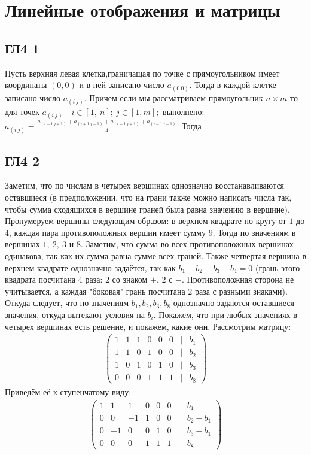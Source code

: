 \newpage		
	\section{Линейные отображения и матрицы}
		
		\subsection{ГЛ4 1}
		Пусть верхняя левая клетка,граничащая по точке с прямоугольником имеет координаты $(0,0)$ и в ней записано число $a_{(0\ 0)}$. Тогда в каждой клетке записано число $a_{(i\ j)}$. Причем если мы рассматриваем прямоугольник $n \times m$ то для точек $a_{(i\ j)} \quad i \in [1,\ n];\ j \in [1, m];$ выполнено: $a_{(i\ j)} = \frac{a_{(i+1\ j+1)} + a_{(i+1\ j-1)} + a_{(i-1\ j+1)} + a_{(i-1\ j-1)}}{4}$. Тогда 
		
		\subsection{ГЛ4 2}
		Заметим, что по числам в четырех вершинах однозначно восстанавливаются оставшиеся (в предположении, что на грани также можно написать числа так, чтобы сумма сходящихся в вершине граней была равна значению в вершине). Пронумеруем вершины следующим образом: в верхнем квадрате по кругу от $1$ до $4$, каждая пара противоположных вершин имеет сумму $9$. Тогда по значениям в вершинах $1,\ 2,\ 3$ и $8$. Заметим, что сумма во всех противоположных вершинах одинакова, так как их сумма равна сумме всех граней. Также четвертая вершина в верхнем квадрате однозначно задаётся, так как $b_1 - b_2 - b_3 + b_4 = 0$ (грань этого квадрата посчитана $4$ раза: $2$ со знаком $+$, $2$ с $-$. Противоположная сторона не учитывается, а каждая "боковая" грань посчитана $2$ раза с разными знаками). Откуда следует, что по значениям $b_1,b_2,b_3,b_8$ однозначно задаются оставшиеся значения, откуда вытекают условия на $b_i$. Покажем, что при любых значениях в четырех вершинах есть решение, и покажем, какие они. Рассмотрим матрицу:
		\begin{gather*}
			\begin{pmatrix} 
				1 & 1 & 1 & 0 & 0 & 0 & | & b_1\\ 
				1 & 1 & 0 & 1 & 0 & 0 & | & b_2\\
				1 & 0 & 1 & 0 & 1 & 0 & | & b_3\\
				0 & 0 & 0 & 1 & 1 & 1 & | & b_8 
			\end{pmatrix}
		\end{gather*} 
		Приведём её к ступенчатому виду:
		\begin{gather*}
			\begin{pmatrix}
				1 & 1  & 1  & 0 & 0 & 0 & | & b_1\\ 
				0 & 0  & -1 & 1 & 0 & 0 & | & b_2 - b_1\\
				0 & -1 & 0  & 0 & 1 & 0 & | & b_3 - b_1\\
				0 & 0  & 0  & 1 & 1 & 1 & | & b_8 
			\end{pmatrix}
		\end{gather*} 
		

